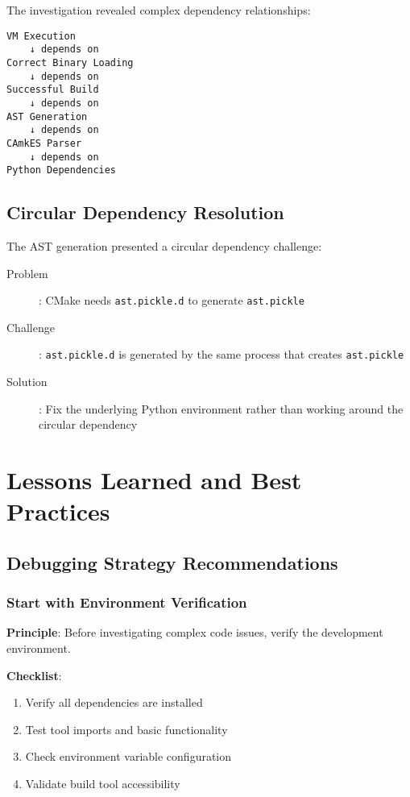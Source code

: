 \documentclass[11pt,a4paper]{article}
\begin{document}
The investigation revealed complex dependency relationships:

\begin{lstlisting}[caption=Dependency Chain Discovery]
VM Execution
    ↓ depends on
Correct Binary Loading
    ↓ depends on  
Successful Build
    ↓ depends on
AST Generation
    ↓ depends on
CAmkES Parser
    ↓ depends on
Python Dependencies
\end{lstlisting}

\subsection{Circular Dependency Resolution}

The AST generation presented a circular dependency challenge:

\begin{description}
\item[Problem]: CMake needs \texttt{ast.pickle.d} to generate \texttt{ast.pickle}
\item[Challenge]: \texttt{ast.pickle.d} is generated by the same process that creates \texttt{ast.pickle}
\item[Solution]: Fix the underlying Python environment rather than working around the circular dependency
\end{description}

\section{Lessons Learned and Best Practices}

\subsection{Debugging Strategy Recommendations}

\subsubsection{Start with Environment Verification}

\textbf{Principle}: Before investigating complex code issues, verify the development environment.

\textbf{Checklist}:
\begin{enumerate}
\item Verify all dependencies are installed
\item Test tool imports and basic functionality
\item Check environment variable configuration
\item Validate build tool accessibility
\end{enumerate}
\end{document}
